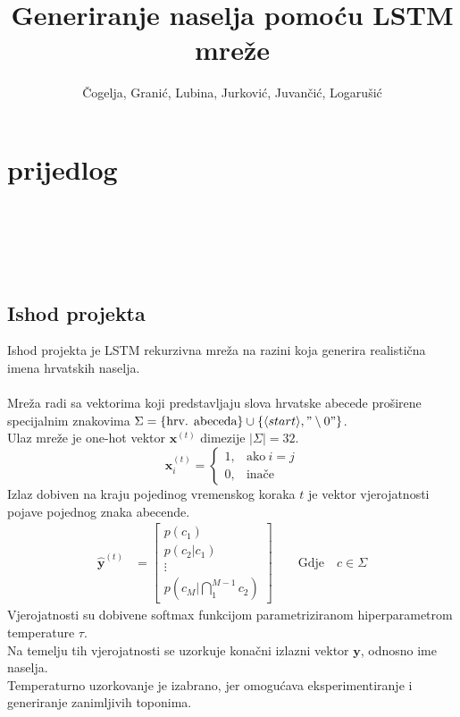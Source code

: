 \documentclass{report}
\title{Generiranje naselja pomoću LSTM mreže}
\author{Čogelja, Granić, Lubina, Jurković, Juvančić, Logarušić}
\begin{document}
\maketitle

\chapter*{prijedlog}
\ \\
\\
\\
\\

\section{Ishod projekta}
Ishod projekta je LSTM rekurzivna mreža na razini koja generira realistična imena hrvatskih naselja.\\
\\
Mreža radi sa vektorima koji predstavljaju slova hrvatske abecede proširene specijalnim znakovima $\Sigma = \{ \text{hrv. abeceda}\} \cup \{\langle start \rangle, "\setminus 0"\}$.\\
Ulaz mreže je one-hot vektor $\mathbf{x}^{(t)}$ dimezije $\lvert \Sigma \rvert = 32$.
\begin{equation}
\mathbf{x}^{(t)}_i=
    \begin{cases}
      1, & \text{ako}\ i=j \\
      0, & \text{inače}
    \end{cases}
\end{equation}
Izlaz dobiven na kraju pojedinog vremenskog koraka $t$ je vektor vjerojatnosti pojave pojednog znaka abecende.\\
\begin{align}
    \hat{\mathbf{y}}^{(t)} &= \begin{bmatrix}
           p(c_1) \\
           p(c_2 | c_1) \\
           \vdots \\
           p(c_M | \bigcap_1^{M-1} c_2)
         \end{bmatrix}
         \quad \quad \text{Gdje} \quad c \in \Sigma
\end{align}
Vjerojatnosti su dobivene softmax funkcijom parametriziranom hiperparametrom temperature $\tau$.\\
Na temelju tih vjerojatnosti se uzorkuje konačni izlazni vektor $\mathbf{y}$, odnosno ime naselja.\\
Temperaturno uzorkovanje je izabrano, jer omogućava eksperimentiranje i generiranje zanimljivih toponima.\\
\end{document}
